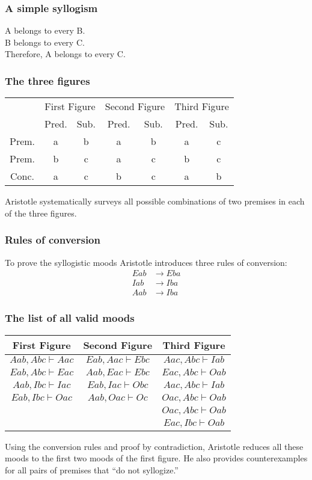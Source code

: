 \documentclass[compress,12pt]{beamer}
\begin{document}
\begin{frame}
    \frametitle{A simple syllogism}

    A belongs to every B.\\
    B belongs to every C.\\
    Therefore, A belongs to every C.
\end{frame}

\begin{frame}
    \frametitle{The three figures}
    \begin{center}
    \begin{tabular}{c|cc|cc|cc}\tiny
         & \multicolumn{2}{c|}{First Figure} & \multicolumn{2}{c|}{Second Figure} & \multicolumn{2}{c}{Third Figure}  \\
         & Pred. & Sub. & Pred. & Sub. & Pred. & Sub. \\ \hline
         Prem. & a & b & a & b & a & c \\
         Prem. & b & c & a & c & b & c \\
         Conc. & a & c & b & c & a & b
    \end{tabular}
    \end{center}
    \vspace{0.3cm}
    Aristotle systematically surveys all possible combinations of two premises in each of the three figures.
\end{frame}

\begin{frame}
    \frametitle{Rules of conversion}
    To prove the syllogistic moods Aristotle introduces three rules of conversion:
    \begin{align*}
        Eab &\to Eba \\
        Iab &\to Iba \\
        Aab &\to Iba
    \end{align*}
\end{frame}

\begin{frame}
    \frametitle{The list of all valid moods}
    \begin{center}
    \begin{tabular}{c|c|c}
        First Figure & Second Figure & Third Figure \\ \hline
        $Aab,Abc\vdash Aac$ & $Eab,Aac\vdash Ebc$ & $Aac,Abc\vdash Iab$ \\
        $Eab,Abc\vdash Eac$ & $Aab,Eac\vdash Ebc$ & $Eac,Abc\vdash Oab$ \\
        $Aab,Ibc\vdash Iac$ & $Eab,Iac\vdash Obc$ & $Aac,Abc\vdash Iab$ \\
        $Eab,Ibc\vdash Oac$ & $Aab,Oac\vdash Oc$ & $Oac,Abc\vdash Oab$ \\
        && $Oac,Abc\vdash Oab$ \\
        && $Eac,Ibc\vdash Oab$
    \end{tabular}
    \end{center}

    Using the conversion rules and proof by contradiction, Aristotle reduces all these moods to the first two moods of the first figure. He also provides counterexamples for all pairs of premises that ``do not syllogize.''
\end{frame}
\end{document}
